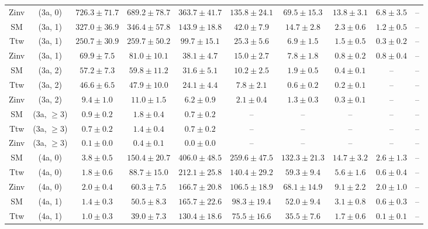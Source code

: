\begin{table}[h!]
{\begin{tabular}{cccccccccc}
	Zinv & (3a, 0) & $726.3\pm 71.7$ & $689.2\pm 78.7$ & $363.7\pm 41.7$ & $135.8\pm 24.1$ & $69.5\pm 15.3$ & $13.8\pm 3.1$ & $6.8\pm 3.5$ & -- \\[0.5ex] 
	SM & (3a, 1) & $327.0\pm 36.9$ & $346.4\pm 57.8$ & $143.9\pm 18.8$ & $42.0\pm 7.9$ & $14.7\pm 2.8$ & $2.3\pm 0.6$ & $1.2\pm 0.5$ & -- \\[0.5ex] 
	Ttw & (3a, 1) & $250.7\pm 30.9$ & $259.7\pm 50.2$ & $99.7\pm 15.1$ & $25.3\pm 5.6$ & $6.9\pm 1.5$ & $1.5\pm 0.5$ & $0.3\pm 0.2$ & -- \\[0.5ex] 
	Zinv & (3a, 1) & $69.9\pm 7.5$ & $81.0\pm 10.1$ & $38.1\pm 4.7$ & $15.0\pm 2.7$ & $7.8\pm 1.8$ & $0.8\pm 0.2$ & $0.8\pm 0.4$ & -- \\[0.5ex] 
	SM & (3a, 2) & $57.2\pm 7.3$ & $59.8\pm 11.2$ & $31.6\pm 5.1$ & $10.2\pm 2.5$ & $1.9\pm 0.5$ & $0.4\pm 0.1$ & -- & -- \\[0.5ex] 
	Ttw & (3a, 2) & $46.6\pm 6.5$ & $47.9\pm 10.0$ & $24.1\pm 4.4$ & $7.8\pm 2.1$ & $0.6\pm 0.2$ & $0.2\pm 0.1$ & -- & -- \\[0.5ex] 
	Zinv & (3a, 2) & $9.4\pm 1.0$ & $11.0\pm 1.5$ & $6.2\pm 0.9$ & $2.1\pm 0.4$ & $1.3\pm 0.3$ & $0.3\pm 0.1$ & -- & -- \\[0.5ex] 
	SM & (3a, $\ge3$) & $0.9\pm 0.2$ & $1.8\pm 0.4$ & $0.7\pm 0.2$ & -- & -- & -- & -- & -- \\[0.5ex] 
	Ttw & (3a, $\ge3$) & $0.7\pm 0.2$ & $1.4\pm 0.4$ & $0.7\pm 0.2$ & -- & -- & -- & -- & -- \\[0.5ex] 
	Zinv & (3a, $\ge3$) & $0.1\pm 0.0$ & $0.4\pm 0.1$ & $0.0\pm 0.0$ & -- & -- & -- & -- & -- \\[0.5ex] 
	SM & (4a, 0) & $3.8\pm 0.5$ & $150.4\pm 20.7$ & $406.0\pm 48.5$ & $259.6\pm 47.5$ & $132.3\pm 21.3$ & $14.7\pm 3.2$ & $2.6\pm 1.3$ & -- \\[0.5ex] 
	Ttw & (4a, 0) & $1.8\pm 0.6$ & $88.7\pm 15.0$ & $212.1\pm 25.8$ & $140.4\pm 29.2$ & $59.3\pm 9.4$ & $5.6\pm 1.6$ & $0.6\pm 0.4$ & -- \\[0.5ex] 
	Zinv & (4a, 0) & $2.0\pm 0.4$ & $60.3\pm 7.5$ & $166.7\pm 20.8$ & $106.5\pm 18.9$ & $68.1\pm 14.9$ & $9.1\pm 2.2$ & $2.0\pm 1.0$ & -- \\[0.5ex] 
	SM & (4a, 1) & $1.4\pm 0.3$ & $50.5\pm 8.3$ & $165.7\pm 22.6$ & $98.3\pm 19.4$ & $52.0\pm 9.4$ & $3.1\pm 0.8$ & $0.6\pm 0.3$ & -- \\[0.5ex] 
	Ttw & (4a, 1) & $1.0\pm 0.3$ & $39.0\pm 7.3$ & $130.4\pm 18.6$ & $75.5\pm 16.6$ & $35.5\pm 7.6$ & $1.7\pm 0.6$ & $0.1\pm 0.1$ & -- \\[0.5ex] 

\end{tabular}}
\end{table}
